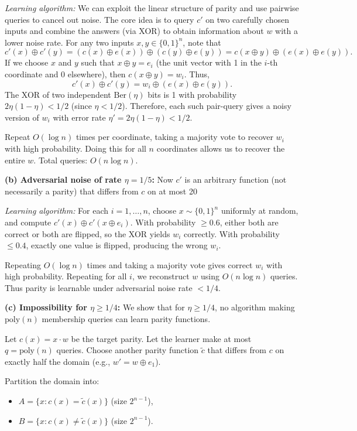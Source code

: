\documentclass[11pt]{article}
\DeclareMathOperator{\1}{\mathbbm{1}}
\begin{document}
\emph{Learning algorithm:} We can exploit the linear structure of parity and use pairwise queries to cancel out noise. The core idea is to query $c'$ on two carefully chosen inputs and combine the answers (via XOR) to obtain information about $w$ with a lower noise rate. For any two inputs $x, y \in \{0,1\}^n$, note that
\[
c'(x) \oplus c'(y) = (c(x) \oplus e(x)) \oplus (c(y) \oplus e(y)) = c(x \oplus y) \oplus (e(x) \oplus e(y)).
\]
If we choose $x$ and $y$ such that $x \oplus y = e_i$ (the unit vector with 1 in the $i$-th coordinate and 0 elsewhere), then $c(x\oplus y) = w_i$. Thus,
\[
c'(x) \oplus c'(y) = w_i \oplus (e(x) \oplus e(y)).
\]
The XOR of two independent $\text{Ber}(\eta)$ bits is 1 with probability $2\eta(1 - \eta) < 1/2$ (since $\eta < 1/2$). Therefore, each such pair-query gives a noisy version of $w_i$ with error rate $\eta' = 2\eta(1 - \eta) < 1/2$.

Repeat $O(\log n)$ times per coordinate, taking a majority vote to recover $w_i$ with high probability. Doing this for all $n$ coordinates allows us to recover the entire $w$. Total queries: $O(n \log n)$.

\textbf{(b) Adversarial noise of rate $\eta = 1/5$:} Now $c'$ is an arbitrary function (not necessarily a parity) that differs from $c$ on at most 20%

\emph{Learning algorithm:} For each $i = 1, \dots, n$, choose $x \sim \{0,1\}^n$ uniformly at random, and compute $c'(x) \oplus c'(x \oplus e_i)$. With probability $\ge 0.6$, either both are correct or both are flipped, so the XOR yields $w_i$ correctly. With probability $\le 0.4$, exactly one value is flipped, producing the wrong $w_i$.

Repeating $O(\log n)$ times and taking a majority vote gives correct $w_i$ with high probability. Repeating for all $i$, we reconstruct $w$ using $O(n \log n)$ queries. Thus parity is learnable under adversarial noise rate $< 1/4$.

\textbf{(c) Impossibility for $\eta \ge 1/4$:} We show that for $\eta \ge 1/4$, no algorithm making $\text{poly}(n)$ membership queries can learn parity functions.

Let $c(x) = x \cdot w$ be the target parity. Let the learner make at most $q = \text{poly}(n)$ queries. Choose another parity function $\tilde{c}$ that differs from $c$ on exactly half the domain (e.g., $w' = w \oplus e_1$).

Partition the domain into:
\begin{itemize}
  \item $A = \{x : c(x) = \tilde{c}(x)\}$ (size $2^{n-1}$),
  \item $B = \{x : c(x) \ne \tilde{c}(x)\}$ (size $2^{n-1}$).
\end{itemize}
\end{document}
